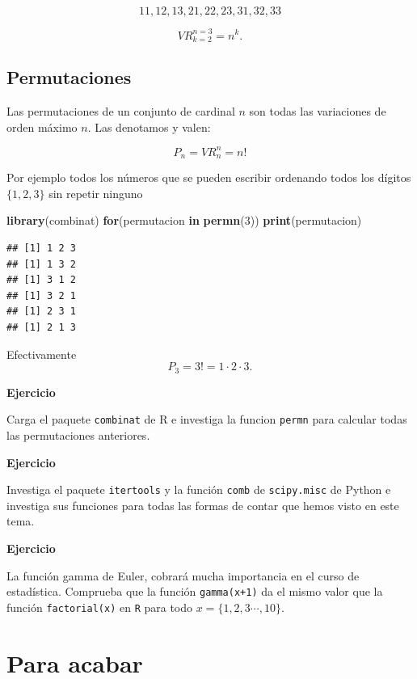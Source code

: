 \documentclass[]{book}
\newenvironment{Shaded}{\begin{snugshade}}{\end{snugshade}}
\newcommand{\ControlFlowTok}[1]{\textcolor[rgb]{0.13,0.29,0.53}{\textbf{#1}}}
\newcommand{\DecValTok}[1]{\textcolor[rgb]{0.00,0.00,0.81}{#1}}
\newcommand{\KeywordTok}[1]{\textcolor[rgb]{0.13,0.29,0.53}{\textbf{#1}}}
\newcommand{\NormalTok}[1]{#1}
\begin{document}
\[11,12,13,21,22,23,31,32,33\]

\[
VR_{k=2}^{n=3}=n^k.
\]

\hypertarget{permutaciones}{%
\subsection{Permutaciones}\label{permutaciones}}

Las permutaciones de un conjunto de cardinal \(n\) son todas las variaciones de orden máximo \(n\).
Las denotamos y valen:

\[
P_n=VR_n^n=n!
\]

Por ejemplo todos los números que se pueden escribir ordenando todos los dígitos \(\{1,2,3\}\) sin repetir ninguno

\begin{Shaded}
\begin{Highlighting}[]
\KeywordTok{library}\NormalTok{(combinat)}
\ControlFlowTok{for}\NormalTok{(permutacion }\ControlFlowTok{in} \KeywordTok{permn}\NormalTok{(}\DecValTok{3}\NormalTok{)) }\KeywordTok{print}\NormalTok{(permutacion)}
\end{Highlighting}
\end{Shaded}

\begin{verbatim}
## [1] 1 2 3
## [1] 1 3 2
## [1] 3 1 2
## [1] 3 2 1
## [1] 2 3 1
## [1] 2 1 3
\end{verbatim}

Efectivamente
\[
P_3=3!=1\cdot  2\cdot 3.
\]

\textbf{Ejercicio}

Carga el paquete \texttt{combinat} de R e investiga la funcion \texttt{permn} para calcular todas las permutaciones anteriores.

\textbf{Ejercicio}

Investiga el paquete \texttt{itertools} y la función \texttt{comb} de \texttt{scipy.misc} de Python e investiga sus funciones para todas las formas de contar que hemos visto en este tema.

\textbf{Ejercicio}

La función gamma de Euler, cobrará mucha importancia en el curso de estadística. Comprueba que la función \texttt{gamma(x+1)} da el mismo valor que la función \texttt{factorial(x)} en \texttt{R} para todo \(x = \{1,2,3\cdots,10\}\).

\hypertarget{para-acabar}{%
\section{Para acabar}\label{para-acabar}}
\end{document}

